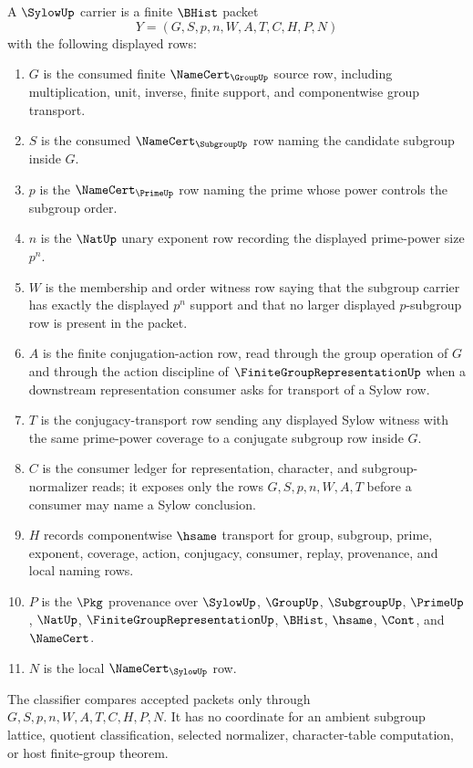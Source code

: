 \begin{definition}
\label{def:sylow-carrier}
A $\SylowUp$ carrier is a finite $\BHist$ packet
$$
Y=(G,S,p,n,W,A,T,C,H,P,N)
$$
with the following displayed rows:
\begin{enumerate}
\item $G$ is the consumed finite $\NameCert_{\GroupUp}$ source row, including multiplication, unit, inverse, finite support, and componentwise group transport.
\item $S$ is the consumed $\NameCert_{\SubgroupUp}$ row naming the candidate subgroup inside $G$.
\item $p$ is the $\NameCert_{\PrimeUp}$ row naming the prime whose power controls the subgroup order.
\item $n$ is the $\NatUp$ unary exponent row recording the displayed prime-power size $p^{n}$.
\item $W$ is the membership and order witness row saying that the subgroup carrier has exactly the displayed $p^{n}$ support and that no larger displayed $p$-subgroup row is present in the packet.
\item $A$ is the finite conjugation-action row, read through the group operation of $G$ and through the action discipline of $\FiniteGroupRepresentationUp$ when a downstream representation consumer asks for transport of a Sylow row.
\item $T$ is the conjugacy-transport row sending any displayed Sylow witness with the same prime-power coverage to a conjugate subgroup row inside $G$.
\item $C$ is the consumer ledger for representation, character, and subgroup-normalizer reads; it exposes only the rows $G,S,p,n,W,A,T$ before a consumer may name a Sylow conclusion.
\item $H$ records componentwise $\hsame$ transport for group, subgroup, prime, exponent, coverage, action, conjugacy, consumer, replay, provenance, and local naming rows.
\item $P$ is the $\Pkg$ provenance over $\SylowUp$, $\GroupUp$, $\SubgroupUp$, $\PrimeUp$, $\NatUp$, $\FiniteGroupRepresentationUp$, $\BHist$, $\hsame$, $\Cont$, and $\NameCert$.
\item $N$ is the local $\NameCert_{\SylowUp}$ row.
\end{enumerate}
The classifier compares accepted packets only through $G,S,p,n,W,A,T,C,H,P,N$. It has no coordinate for an ambient subgroup lattice, quotient classification, selected normalizer, character-table computation, or host finite-group theorem.
\end{definition}

